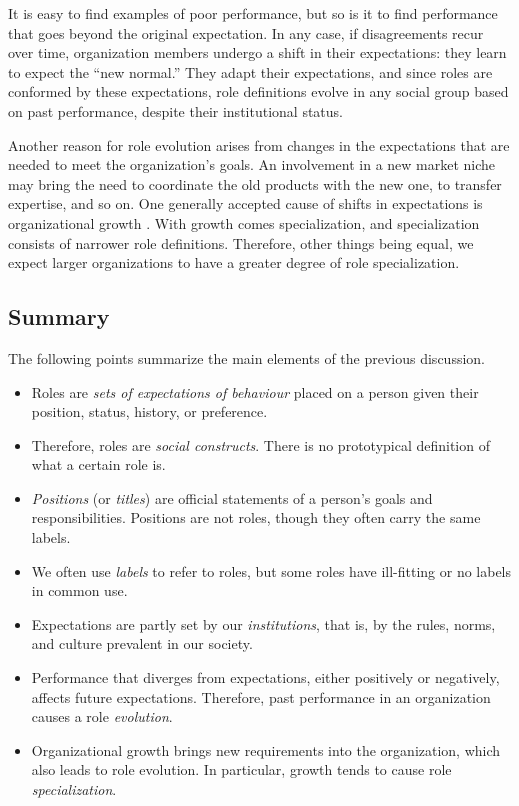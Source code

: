 \documentclass[10pt, conference, compsocconf]{IEEEtran}
\begin{document}
It is easy to find examples of poor performance, but so is it to find performance that goes beyond the original expectation. In any case, if disagreements recur over time, organization members undergo a shift in their expectations: they learn to expect the ``new normal.'' They adapt their expectations, and since roles are conformed by these expectations, role definitions evolve in any social group based on past performance, despite their institutional status.

Another reason for role evolution arises from changes in the expectations that are needed to meet the organization's goals. An involvement in a new market niche may bring the need to coordinate the old products with the new one, to transfer expertise, and so on. One generally accepted cause of shifts in expectations is organizational growth \cite{Blau1971,Haveman1993}. With growth comes specialization, and specialization consists of narrower role definitions. Therefore, other things being equal, we expect larger organizations to have a greater degree of role specialization.


\subsection{Summary}

The following points summarize the main elements of the previous discussion.

\begin{itemize}
\item Roles are \emph{sets of expectations of behaviour} placed on a person given their position, status, history, or preference.

\item Therefore, roles are \emph{social constructs}. There is no prototypical definition of what a certain role is.

\item \emph{Positions} (or \emph{titles}) are official statements of a person's goals and responsibilities. Positions are not roles, though they often carry the same labels.

\item We often use \emph{labels} to refer to roles, but some roles have ill-fitting or no labels in common use.

\item Expectations are partly set by our \emph{institutions}, that is, by the rules, norms, and culture prevalent in our society.

\item Performance that diverges from expectations, either positively or negatively, affects future expectations. Therefore, past performance in an organization causes a role \emph{evolution}.

\item Organizational growth brings new requirements into the organization, which also leads to role evolution. In particular, growth tends to cause role \emph{specialization}.
\end{itemize}
\end{document}
